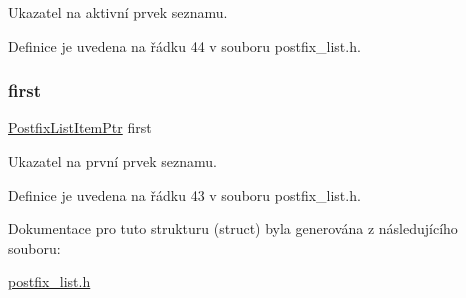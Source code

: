 Ukazatel na aktivní prvek seznamu. 



Definice je uvedena na řádku 44 v souboru postfix\+\_\+list.\+h.

\mbox{\label{struct_s___postfix_list_a020add97bb92cd6b0f237d2d7f8b86e3}} 
\subsubsection{\texorpdfstring{first}{first}}
{\footnotesize\ttfamily \hyperlink{postfix__list_8h_a8feb56873a59e2796c49dce10bc3d21c}{Postfix\+List\+Item\+Ptr} first}



Ukazatel na první prvek seznamu. 



Definice je uvedena na řádku 43 v souboru postfix\+\_\+list.\+h.



Dokumentace pro tuto strukturu (struct) byla generována z následujícího souboru\+:\begin{DoxyCompactItemize}
\item 
\hyperlink{postfix__list_8h}{postfix\+\_\+list.\+h}\end{DoxyCompactItemize}
